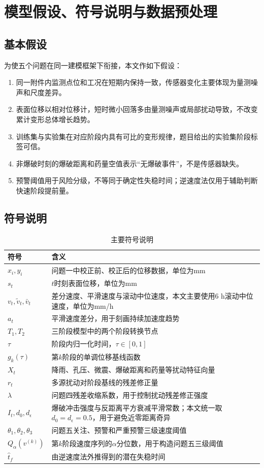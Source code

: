 \chapter{模型假设、符号说明与数据预处理}

\section{基本假设}

为使五个问题在同一建模框架下衔接，本文作如下假设：
\begin{enumerate}
  \item 同一附件内监测点位和工况在短期内保持一致，传感器变化主要体现为量测噪声和尺度差异。
  \item 表面位移以相对位移计，短时微小回落多由量测噪声或局部扰动导致，不改变累计变形总体增长趋势。
  \item 训练集与实验集在对应阶段内具有可比的变形规律，题目给出的实验集阶段标签可信。
  \item 非爆破时刻的爆破距离和药量空值表示“无爆破事件”，不是传感器缺失。
  \item 预警阈值用于风险分级，不等同于确定性失稳时间；逆速度法仅用于辅助判断快速阶段提前量。
\end{enumerate}


\section{符号说明}

\begin{table}[H]
\centering
\small
\caption{主要符号说明}
\label{tab:symbols}
\begin{tabularx}{0.94\textwidth}{L{2.4cm}X}
\toprule
符号 & 含义 \\
\midrule
$x_i,y_i$ & 问题一中校正前、校正后的位移数据，单位为mm \\
$s_t$ & $t$时刻表面位移，单位为mm \\
$v_t,\tilde v_t,\bar v_t$ & 差分速度、平滑速度与滚动中位速度，本文主要使用6 h滚动中位速度，单位为mm/h \\
$a_t$ & 平滑速度差分，用于刻画持续加速度趋势 \\
$T_1,T_2$ & 三阶段模型中的两个阶段转换节点 \\
$\tau$ & 阶段内归一化时间，$\tau\in[0,1]$ \\
$g_k(\tau)$ & 第$k$阶段的单调位移基线函数 \\
$X_t$ & 降雨、孔压、微震、爆破距离和药量等扰动特征向量 \\
$r_t$ & 多源扰动对阶段基线的残差修正量 \\
$\lambda$ & 问题四残差收缩系数，用于控制扰动残差修正强度 \\
$I_t,d_0,d_\epsilon$ & 爆破冲击强度与反距离平方衰减平滑常数；本文统一取$d_0=d_\epsilon=0.5$，用于避免近零距离奇异 \\
$\theta_1,\theta_2,\theta_3$ & 问题五关注、预警和严重预警三级速度阈值 \\
$Q_\alpha(v^{(k)})$ & 第$k$阶段速度序列的$\alpha$分位数，用于构造问题五三级阈值 \\
$\hat t_f$ & 由逆速度法外推得到的潜在失稳时间 \\
\bottomrule
\end{tabularx}
\end{table}

